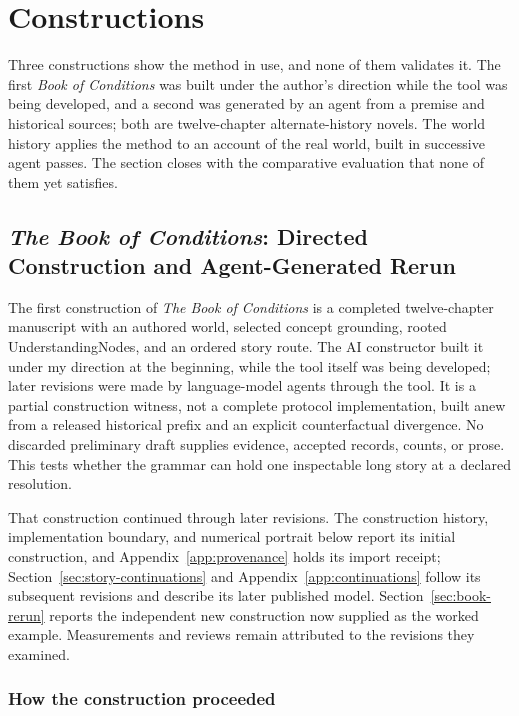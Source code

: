 \documentclass[11pt,a4paper]{article}
\begin{document}
\section{Constructions}
\label{sec:constructions}

Three constructions show the method in use, and none of them validates it. The
first \emph{Book of Conditions} was built under the author's direction while the
tool was being developed, and a second was generated by an agent from a premise
and historical sources; both are twelve-chapter alternate-history novels. The
world history applies the method to an account of the real world, built in
successive agent passes. The section closes with the comparative evaluation that
none of them yet satisfies.

\subsection{\emph{The Book of Conditions}: Directed Construction and Agent-Generated Rerun}
\label{sec:book-construction}

The first construction of \emph{The Book of Conditions} is a completed twelve-chapter manuscript with
an authored world, selected concept grounding, rooted UnderstandingNodes, and
an ordered story route. The AI constructor built it under my direction at the beginning, while the tool
itself was being developed; later revisions were made by language-model agents
through the tool.
It is a partial construction witness, not a complete protocol implementation,
built anew from a released historical prefix and an explicit counterfactual divergence. No
discarded preliminary draft supplies evidence, accepted records, counts, or prose.
This tests whether the grammar can hold
one inspectable long story at a declared resolution.

That construction continued through later revisions. The construction history,
implementation boundary, and numerical portrait below report its initial
construction, and Appendix~\ref{app:provenance} holds its import receipt;
Section~\ref{sec:story-continuations} and Appendix~\ref{app:continuations}
follow its subsequent revisions and describe its later published model.
Section~\ref{sec:book-rerun} reports the independent new construction now
supplied as the worked example. Measurements and reviews remain attributed to
the revisions they examined.

\subsubsection{How the construction proceeded}
\end{document}
